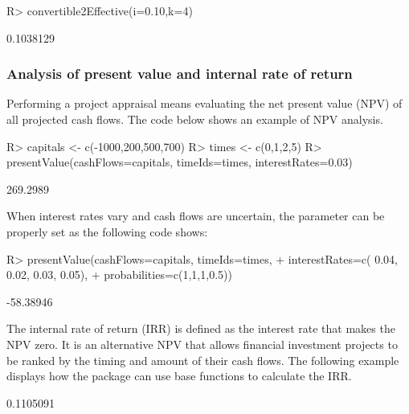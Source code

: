 \documentclass[nojss]{jss}
\begin{document}
\begin{Schunk}
\begin{Sinput}
R> convertible2Effective(i=0.10,k=4)
\end{Sinput}
\begin{Soutput}
[1] 0.1038129
\end{Soutput}
\end{Schunk}
\subsubsection{Analysis of present value and internal rate of return}\label{sss:pva}
Performing a project appraisal means evaluating the net present value (NPV) of all projected cash flows.
The code below shows an example of NPV analysis.
\begin{Schunk}
\begin{Sinput}
R> capitals <- c(-1000,200,500,700)
R> times <- c(0,1,2,5)
R> presentValue(cashFlows=capitals, timeIds=times, interestRates=0.03)
\end{Sinput}
\begin{Soutput}
[1] 269.2989
\end{Soutput}
\end{Schunk}
When interest rates vary and cash flows are uncertain, the
 parameter can be
properly set as the following code shows:
\begin{Schunk}
\begin{Sinput}
R> presentValue(cashFlows=capitals, timeIds=times, 
+  interestRates=c( 0.04, 0.02, 0.03, 0.05), 
+  probabilities=c(1,1,1,0.5))
\end{Sinput}
\begin{Soutput}
[1] -58.38946
\end{Soutput}
\end{Schunk}
The internal rate of return (IRR) is defined as the interest rate that makes the
NPV zero. It is an alternative NPV that allows financial investment projects to be ranked
by the timing and amount of their cash flows.
The following example displays how the
 package can use base  functions to calculate the IRR.

\begin{Schunk}
\begin{Soutput}
[1] 0.1105091
\end{Soutput}
\end{Schunk}
\end{document}
